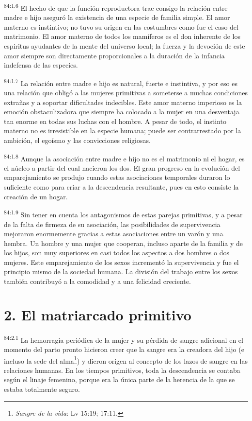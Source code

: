 \par
\textsuperscript{84:1.6} El hecho de que la función reproductora trae consigo la relación entre madre e hijo aseguró la existencia de una especie de familia simple. El amor materno es instintivo; no tuvo su origen en las costumbres como fue el caso del matrimonio. El amor materno de todos los mamíferos es el don inherente de los espíritus ayudantes de la mente del universo local; la fuerza y la devoción de este amor siempre son directamente proporcionales a la duración de la infancia indefensa de las especies.

\par
\textsuperscript{84:1.7} La relación entre madre e hijo es natural, fuerte e instintiva, y por eso es una relación que obligó a las mujeres primitivas a someterse a muchas condiciones extrañas y a soportar dificultades indecibles. Este amor materno imperioso es la emoción obstaculizadora que siempre ha colocado a la mujer en una desventaja tan enorme en todas sus luchas con el hombre. A pesar de todo, el instinto materno no es irresistible en la especie humana; puede ser contrarrestado por la ambición, el egoísmo y las convicciones religiosas.

\par
\textsuperscript{84:1.8} Aunque la asociación entre madre e hijo no es el matrimonio ni el hogar, es el núcleo a partir del cual nacieron los dos. El gran progreso en la evolución del emparejamiento se produjo cuando estas asociaciones temporales duraron lo suficiente como para criar a la descendencia resultante, pues en esto consiste la creación de un hogar.

\par
\textsuperscript{84:1.9} Sin tener en cuenta los antagonismos de estas parejas primitivas, y a pesar de la falta de firmeza de su asociación, las posibilidades de supervivencia mejoraron enormemente gracias a estas asociaciones entre un varón y una hembra. Un hombre y una mujer que cooperan, incluso aparte de la familia y de los hijos, son muy superiores en casi todos los aspectos a dos hombres o dos mujeres. Este emparejamiento de los sexos incrementó la supervivencia y fue el principio mismo de la sociedad humana. La división del trabajo entre los sexos también contribuyó a la comodidad y a una felicidad creciente.

\section*{2. El matriarcado primitivo}
\par
\textsuperscript{84:2.1} La hemorragia periódica de la mujer y su pérdida de sangre adicional en el momento del parto pronto hicieron creer que la sangre era la creadora del hijo (e incluso la sede del alma\footnote{\textit{Sangre de la vida}: Lv 15:19; 17:11.}) y dieron origen al concepto de los lazos de sangre en las relaciones humanas. En los tiempos primitivos, toda la descendencia se contaba según el linaje femenino, porque era la única parte de la herencia de la que se estaba totalmente seguro.

